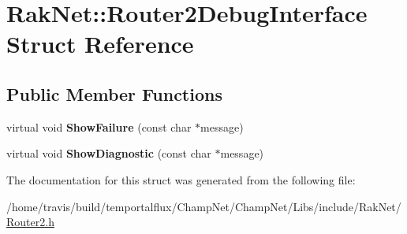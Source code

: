 \hypertarget{struct_rak_net_1_1_router2_debug_interface}{\section{Rak\-Net\-:\-:Router2\-Debug\-Interface Struct Reference}
\label{struct_rak_net_1_1_router2_debug_interface}
}
\subsection*{Public Member Functions}
\begin{DoxyCompactItemize}
\item 
\hypertarget{struct_rak_net_1_1_router2_debug_interface_a6f9b9a5797056e27f9f02977cd65ea7f}{virtual void {\bfseries Show\-Failure} (const char $\ast$message)}\label{struct_rak_net_1_1_router2_debug_interface_a6f9b9a5797056e27f9f02977cd65ea7f}

\item 
\hypertarget{struct_rak_net_1_1_router2_debug_interface_a963719e5ef6c5577e11827e323f3424b}{virtual void {\bfseries Show\-Diagnostic} (const char $\ast$message)}\label{struct_rak_net_1_1_router2_debug_interface_a963719e5ef6c5577e11827e323f3424b}

\end{DoxyCompactItemize}


The documentation for this struct was generated from the following file\-:\begin{DoxyCompactItemize}
\item 
/home/travis/build/temportalflux/\-Champ\-Net/\-Champ\-Net/\-Libs/include/\-Rak\-Net/\hyperlink{_router2_8h}{Router2.\-h}\end{DoxyCompactItemize}

